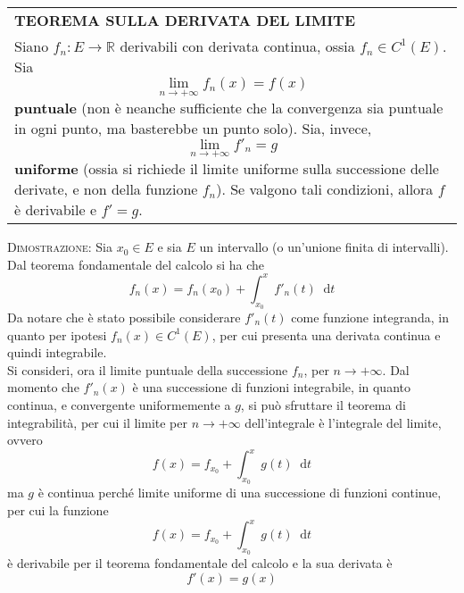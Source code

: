 \documentclass[a4paper]{extarticle}
\renewcommand\arraystretch{}
\newcommand*\dif{\mathop{}\!\mathrm{d}}
\begin{document}
\vspace{1em}
\setlength{\tabcolsep}{14pt}
\renewcommand{\arraystretch}{2}
\noindent
\begin{tabularx}{\textwidth}{@{}|P|@{}}
    \hline
    {\textbf{TEOREMA SULLA DERIVATA DEL LIMITE}}\\
    \parbox{\linewidth}{Siano $f_n : E \to \mathbb{R}$ derivabili con derivata continua, ossia $f_n \in C^1(E)$. Sia
    \[\lim_{n \to +\infty} f_n(x) = f(x)\]
    \textbf{puntuale} (non è neanche sufficiente che la convergenza sia puntuale in ogni punto, ma basterebbe un punto solo). Sia, invece,
    \[\lim_{n \to +\infty} f'_n = g\]
    \textbf{uniforme} (ossia si richiede il limite uniforme sulla successione delle derivate, e non della funzione $f_n$). Se valgono tali condizioni, allora $f$ è derivabile e $f'=g$.\vspace{3mm}}\\
    \hline
\end{tabularx}

\vspace{2em}
\noindent
\normalfont \normalsize
\textsc{Dimostrazione}: Sia $x_0 \in E$ e sia $E$ un intervallo (o un'unione finita di intervalli). Dal teorema fondamentale del calcolo si ha che
\[f_n(x) = f_n(x_0) + \int_{x_0}^x f'_{n}(t) \dif t\]
Da notare che è stato possibile considerare $f'_{n}(t)$ come funzione integranda, in quanto per ipotesi $f_n(x) \in C^1(E)$, per cui presenta una derivata continua e quindi integrabile.\\
Si consideri, ora il limite puntuale della successione $f_n$, per $n \to +\infty$. Dal momento che $f'_n(x)$ è una successione di funzioni integrabile, in quanto continua, e convergente uniformemente a $g$, si può sfruttare il teorema di integrabilità, per cui il limite per $n \to +\infty$ dell'integrale è l'integrale del limite, ovvero
\[f(x) = f_{x_0} + \int_{x_0}^x g(t) \dif t\]
ma $g$ è continua perché limite uniforme di una successione di funzioni continue, per cui la funzione
\[f(x) = f_{x_0} + \int_{x_0}^x g(t) \dif t\]
è derivabile per il teorema fondamentale del calcolo e la sua derivata è
\[f'(x) = g(x)\]
\end{document}
